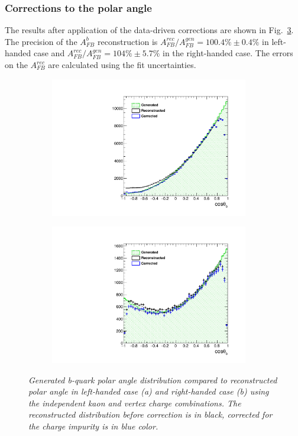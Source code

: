 \subsubsection{Corrections to the polar angle}
The results after application of the data-driven corrections are shown in Fig.~\ref{fig:BAsymmetryCorrected_3}. 
The precision of the $A_{FB}^b$ reconstruction is $A_{FB}^{rec}/A^{gen}_{FB} = 100.4\%\pm 0.4\%$ in left-handed case and  $A_{FB}^{rec}/A^{gen}_{FB} = 104\%\pm5.7\%$ in the right-handed case. 
The errors on the $A_{FB}^{rec}$ are calculated using the fit uncertainties. 

\begin{figure}
	\centering
	\begin{subfigure}{0.5\textwidth}
		\includegraphics[width=0.95\textwidth]{ILD/plots/basymmetry-norec-corr-nobkg-left.pdf}
		\caption{\label{fig:BAsymmetryCorrected_a_3} }
	\end{subfigure}%
	\begin{subfigure}{0.5\textwidth}
		\centering
		\includegraphics[width=0.95\textwidth]{ILD/plots/basymmetry-norec-corr-nobkg-right.pdf}
		\caption{\label{fig:BAsymmetryCorrected_b_3} }
	\end{subfigure}
	\caption{\sl Generated b-quark polar angle distribution compared to reconstructed polar angle in left-handed case (a) and right-handed case (b) using the independent kaon and vertex charge combinations. The reconstructed distribution before correction is in black, corrected for the charge impurity is in blue color. }
	\label{fig:BAsymmetryCorrected_3}
\end{figure}
